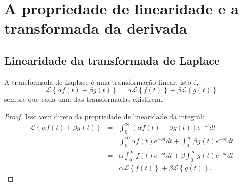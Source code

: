 
%
\chapter{A propriedade de linearidade e a transformada da derivada}

\section{Linearidade da transformada de Laplace}
\begin{propr}{\label{prop_lin}}
A transformada de Laplace é uma transformação linear, isto é,
\begin{equation}
\mathcal{L }\left\{\alpha f(t)+\beta g(t)\right\}=\alpha \mathcal{L }\left\{ f(t)\right\}+\beta\mathcal{L }\left\{g(t)\right\}
\end{equation}
sempre que cada uma das transformadas existirem. 
\end{propr}
\begin{proof}
Isso vem direto da propriedade de linearidade da integral:
\begin{eqnarray*}
\mathcal{L }\left\{\alpha f(t)+\beta g(t)\right\}&=&\int_0^\infty \left(\alpha f(t)+\beta g(t)\right)e^{-st}dt\\
&=&\int_0^\infty \alpha f(t)e^{-st}dt+\int_0^\infty\beta g(t)e^{-st}dt\\
&=&\alpha\int_0^\infty  f(t)e^{-st}dt+\beta\int_0^\infty g(t)e^{-st}dt\\
&=&\alpha \mathcal{L }\left\{ f(t)\right\}+\beta\mathcal{L }\left\{g(t)\right\}.
\end{eqnarray*}
\end{proof}
